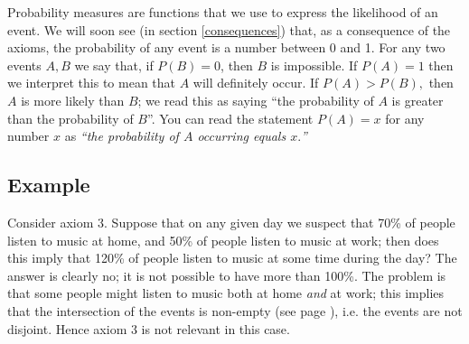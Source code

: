 \noindent Probability measures are functions that we use to express the likelihood of an event. We will soon see (in section \ref{consequences}) that, as a consequence of the axioms, the probability of any event is a number between 0 and 1. For any two events $A,B$ we say that, if $P(B) = 0$, then $B$ is impossible. If $P(A) = 1$ then we interpret this to mean that $A$ will definitely occur. If $P(A) > P(B),$ then $A$ is more likely than $B$; we read this as saying ``the probability of $A$ is greater than the probability of $B$''. You can read the statement $P(A) = x$ for any number $x$ as \textit{``the probability of $A$ occurring equals $x.$''}

\subsection{Example}
Consider axiom 3. Suppose that on any given day we suspect that 70\% of people listen to music at home, and 50\% of people listen to music at work; then does this imply that 120\% of people listen to music at some time during the day? The answer is clearly no; it is not possible to have more than 100\%. The problem is that some people might listen to music both at home \textit{and} at work; this implies that the intersection of the events is non-empty (see page \pageref{disjoint}), i.e. the events are not disjoint. Hence axiom 3 is not relevant in this case.


